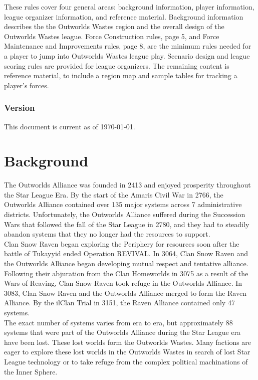 \documentclass{article}
\begin{document}
These rules cover four general areas: background information, player information, league organizer information, and reference material.
Background information describes the the Outworlds Wastes region and the overall design of the Outworlds Wastes league.
Force Construction rules, page 5, and Force Maintenance and Improvements rules, page 8, are the minimum rules needed for a player to jump into Outworlds Wastes league play.
Scenario design and league scoring rules are provided for league organizers.
The remaining content is reference material, to include a region map and sample tables for tracking a player's forces.\\

\subsubsection*{Version}

This document is current as of \today.

\newpage

\tableofcontents
\newpage

\section{Background}

The Outworlds Alliance was founded in 2413 and enjoyed prosperity throughout the Star League Era.
By the start of the Amaris Civil War in 2766, the Outworlds Alliance contained over 135 major systems across 7 administrative districts.
Unfortunately, the Outworlds Alliance suffered during the Succession Wars that followed the fall of the Star League in 2780, and they had to steadily abandon systems that they no longer had the resources to support.\\

Clan Snow Raven began exploring the Periphery for resources soon after the battle of Tukayyid ended Operation REVIVAL.
In 3064, Clan Snow Raven and the Outworlds Alliance began developing mutual respect and tentative alliance.
Following their abjuration from the Clan Homeworlds in 3075 as a result of the Wars of Reaving, Clan Snow Raven took refuge in the Outworlds Alliance.
In 3083, Clan Snow Raven and the Outworlds Alliance merged to form the Raven Alliance.
By the ilClan Trial in 3151, the Raven Alliance contained only 47 systems.\\

The exact number of systems varies from era to era, but approximately 88 systems that were part of the Outworlds Alliance during the Star League era have been lost.
These lost worlds form the Outworlds Wastes.
Many factions are eager to explore these lost worlds in the Outworlds Wastes in search of lost Star League technology or to take refuge from the complex political machinations of the Inner Sphere.\\
\end{document}
